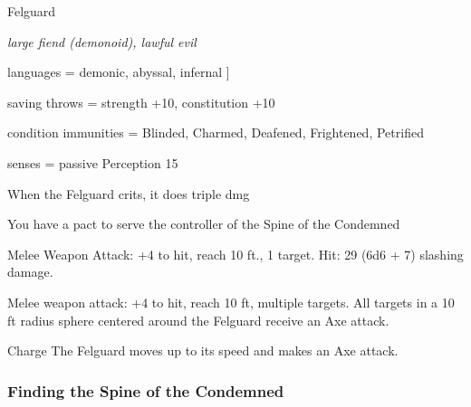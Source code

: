 \begin{monsterbox}{Felguard}
	\begin{hangingpar}
		\textit{large fiend (demonoid), lawful evil}
	\end{hangingpar}
	\dndline%
	\basics[armorclass = 16 Plate, hitpoints = 50 + 3 $\times$ player level, speed = 50 ft]
	\dndline%
	\stats[STR = \stat{24}, DEX = \stat{18}, CON = \stat{24}, INT = \stat{12}, WIS = \stat{13},	CHA = \stat{19}]
	\dndline
	languages = {demonic, abyssal, infernal}
	]
	
	\dndline%
	
	saving throws = strength +10, constitution +10

	condition immunities =  Blinded, Charmed, Deafened, Frightened, Petrified 
	
	senses = passive Perception 15
	
	\dndline%
	\begin{monsteraction}
		When the Felguard crits, it does triple dmg
	\end{monsteraction}	
	\begin{monsteraction}
		You have a pact to serve the controller of the Spine of the Condemned
	\end{monsteraction}	
	\begin{monsteraction}[Axe]
		Melee Weapon Attack: +4 to hit, reach 10 ft., 1 target. Hit: 29 (6d6 + 7) slashing damage. 
	\end{monsteraction}	
	\begin{monsteraction}
		Melee weapon attack: +4 to hit, reach 10 ft, multiple targets. All targets in a 10 ft radius sphere centered around the Felguard receive an Axe attack.
	\end{monsteraction}	
	\begin{monsteraction}{Charge}
		The Felguard moves up to its speed and makes an Axe attack. 
	\end{monsteraction}
\end{monsterbox}

\subsubsection{Finding the Spine of the Condemned}